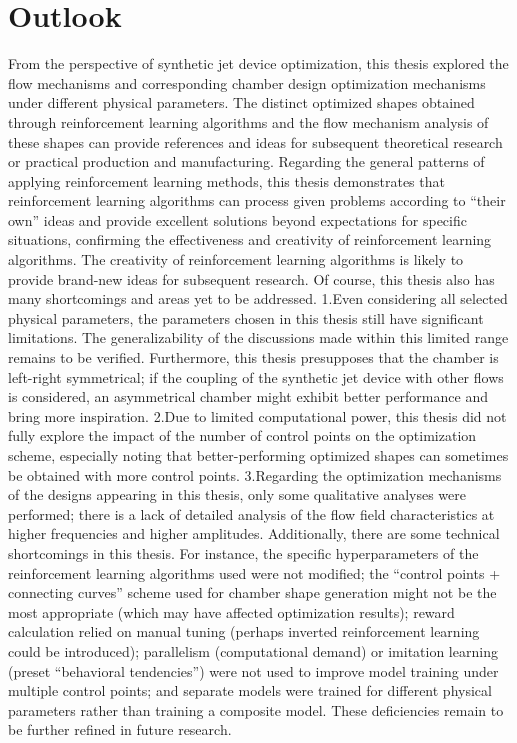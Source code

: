 \documentclass{article}
\begin{document}
\section*{Outlook}
\addtocounter{section}{1}
\setcounter{subsection}{0}
\indent

From the perspective of synthetic jet device optimization, this thesis explored the flow mechanisms and corresponding chamber design optimization mechanisms under different physical parameters.
The distinct optimized shapes obtained through reinforcement learning algorithms and the flow mechanism analysis of these shapes can provide references and ideas for subsequent theoretical research or practical production and manufacturing.
Regarding the general patterns of applying reinforcement learning methods, this thesis demonstrates that reinforcement learning algorithms can process given problems according to ``their own'' ideas and provide excellent solutions beyond expectations for specific situations, confirming the effectiveness and creativity of reinforcement learning algorithms.
The creativity of reinforcement learning algorithms is likely to provide brand-new ideas for subsequent research.
Of course, this thesis also has many shortcomings and areas yet to be addressed.
1.Even considering all selected physical parameters, the parameters chosen in this thesis still have significant limitations.
The generalizability of the discussions made within this limited range remains to be verified.
Furthermore, this thesis presupposes that the chamber is left-right symmetrical; if the coupling of the synthetic jet device with other flows is considered, an asymmetrical chamber might exhibit better performance and bring more inspiration.
2.Due to limited computational power, this thesis did not fully explore the impact of the number of control points on the optimization scheme, especially noting that better-performing optimized shapes can sometimes be obtained with more control points.
3.Regarding the optimization mechanisms of the designs appearing in this thesis, only some qualitative analyses were performed; there is a lack of detailed analysis of the flow field characteristics at higher frequencies and higher amplitudes.
Additionally, there are some technical shortcomings in this thesis.
For instance, the specific hyperparameters of the reinforcement learning algorithms used were not modified;
the ``control points + connecting curves'' scheme used for chamber shape generation might not be the most appropriate (which may have affected optimization results);
reward calculation relied on manual tuning (perhaps inverted reinforcement learning could be introduced);
parallelism (computational demand) or imitation learning (preset ``behavioral tendencies'') were not used to improve model training under multiple control points;
and separate models were trained for different physical parameters rather than training a composite model.
These deficiencies remain to be further refined in future research.
\end{document}
